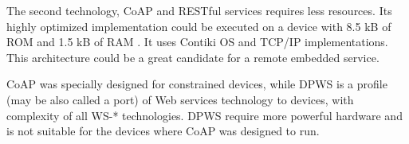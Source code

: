 The second technology, CoAP and RESTful services requires less resources. Its
highly optimized implementation could be executed on a device with 8.5 kB of ROM
and 1.5 kB of RAM \cite{6076698}. It uses Contiki OS and TCP/IP
implementations. This architecture could be a great candidate for  a remote
embedded service.

CoAP was specially designed for constrained devices, while DPWS is a profile
(may be also called a port) of Web services technology to devices, with
complexity of all WS-* technologies. DPWS require more powerful hardware and is
not suitable for the devices where CoAP was designed to run.
